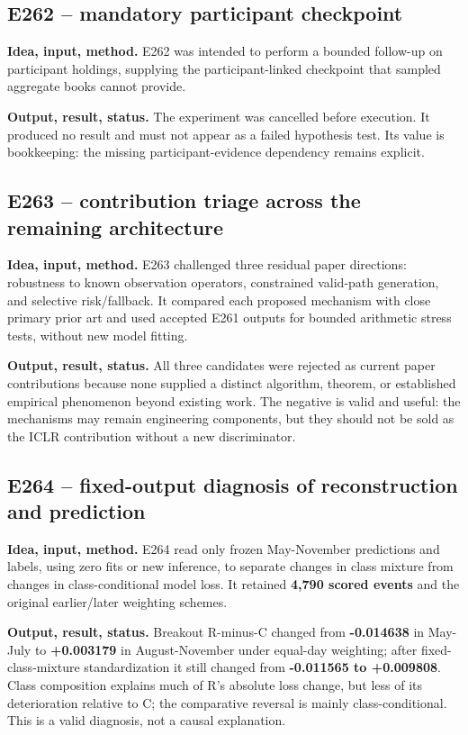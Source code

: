 \documentclass[10pt,a4paper]{article}
\begin{document}
\subsection{E262 -- mandatory participant checkpoint}
\textbf{Idea, input, method.} E262 was intended to perform a bounded follow-up on participant holdings, supplying the participant-linked checkpoint that sampled aggregate books cannot provide.\par
\textbf{Output, result, status.} The experiment was cancelled before execution. It produced no result and must not appear as a failed hypothesis test. Its value is bookkeeping: the missing participant-evidence dependency remains explicit.\par
\subsection{E263 -- contribution triage across the remaining architecture}
\textbf{Idea, input, method.} E263 challenged three residual paper directions: robustness to known observation operators, constrained valid-path generation, and selective risk/fallback. It compared each proposed mechanism with close primary prior art and used accepted E261 outputs for bounded arithmetic stress tests, without new model fitting.\par
\textbf{Output, result, status.} All three candidates were rejected as current paper contributions because none supplied a distinct algorithm, theorem, or established empirical phenomenon beyond existing work. The negative is valid and useful: the mechanisms may remain engineering components, but they should not be sold as the ICLR contribution without a new discriminator.\par
\subsection{E264 -- fixed-output diagnosis of reconstruction and prediction}
\textbf{Idea, input, method.} E264 read only frozen May-November predictions and labels, using zero fits or new inference, to separate changes in class mixture from changes in class-conditional model loss. It retained \textbf{4,790 scored events} and the original earlier/later weighting schemes.\par
\textbf{Output, result, status.} Breakout R-minus-C changed from \textbf{-0.014638} in May-July to \textbf{+0.003179} in August-November under equal-day weighting; after fixed-class-mixture standardization it still changed from \textbf{-0.011565 to +0.009808}. Class composition explains much of R's absolute loss change, but less of its deterioration relative to C; the comparative reversal is mainly class-conditional. This is a valid diagnosis, not a causal explanation.\par
\end{document}
